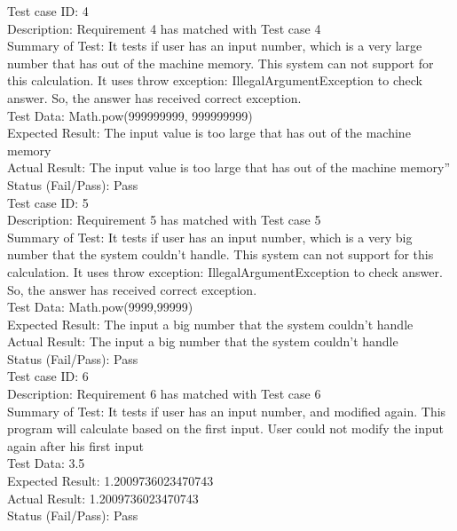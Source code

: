 \documentclass{article}
\begin{document}
Test case ID: 4 \\
Description: Requirement 4 has matched with Test case 4 \\
Summary of Test: It tests if user has an input number, which is a very large number that has out of the machine memory. This system can not support for this calculation. It uses throw exception: IllegalArgumentException to check answer. So, the answer has received correct exception. \\
Test Data: Math.pow(999999999, 999999999) \\
Expected Result: The input value is too large that has out of the machine memory \\
Actual Result: The input value is too large that has out of the machine memory” \\
Status (Fail/Pass): Pass \\


Test case ID: 5 \\
Description: Requirement 5 has matched with Test case 5 \\
Summary of Test: It tests if user has an input number, which is a very big number that the system couldn't handle. This system can not support for this calculation. It uses throw exception: IllegalArgumentException to check answer. So, the answer has received correct exception. \\
Test Data: Math.pow(9999,99999) \\
Expected Result: The input a big number that the system couldn't handle \\
Actual Result: The input a big number that the system couldn't handle \\
Status (Fail/Pass): Pass \\


Test case ID: 6 \\
Description: Requirement 6 has matched with Test case 6 \\
Summary of Test: It tests if user has an input number, and modified again. This program will calculate based on the first input. User could not modify the input again after his first input \\
Test Data: 3.5 \\
Expected Result: 1.2009736023470743 \\
Actual Result: 1.2009736023470743 \\
Status (Fail/Pass): Pass \\
\end{document}
